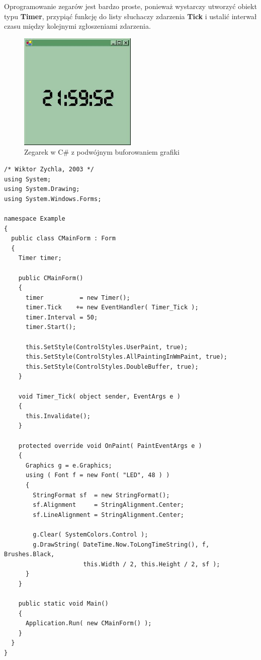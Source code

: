 Oprogramowanie zegarów jest bardzo proste, ponieważ wystarczy utworzyć obiekt typu {\bf Timer}, 
przypiąć funkcję do listy słuchaczy zdarzenia {\bf Tick} i ustalić interwał czasu między kolejnymi 
zgłoszeniami zdarzenia.

\begin{figure}
\begin{center}
\includegraphics[width=0.50\textwidth]{./pic/swf01}
\caption{Zegarek w C\# z podwójnym buforowaniem grafiki}
\end{center}
\end{figure}

\label{kodZegarek}

\begin{scriptsize}
\begin{verbatim}
/* Wiktor Zychla, 2003 */
using System;
using System.Drawing;
using System.Windows.Forms;

namespace Example
{
  public class CMainForm : Form
  {   
    Timer timer;    

    public CMainForm()
    {
      timer          = new Timer();
      timer.Tick    += new EventHandler( Timer_Tick );
      timer.Interval = 50;
      timer.Start();

      this.SetStyle(ControlStyles.UserPaint, true);
      this.SetStyle(ControlStyles.AllPaintingInWmPaint, true);
      this.SetStyle(ControlStyles.DoubleBuffer, true);
    } 

    void Timer_Tick( object sender, EventArgs e )
    {              
      this.Invalidate();
    }

    protected override void OnPaint( PaintEventArgs e )
    {
      Graphics g = e.Graphics;
      using ( Font f = new Font( "LED", 48 ) )
      {
        StringFormat sf  = new StringFormat();
        sf.Alignment     = StringAlignment.Center;
        sf.LineAlignment = StringAlignment.Center;

        g.Clear( SystemColors.Control );
        g.DrawString( DateTime.Now.ToLongTimeString(), f, Brushes.Black, 
                      this.Width / 2, this.Height / 2, sf );
      }
    }

    public static void Main()
    {
      Application.Run( new CMainForm() );
    }
  }
}
\end{verbatim}
\end{scriptsize}

